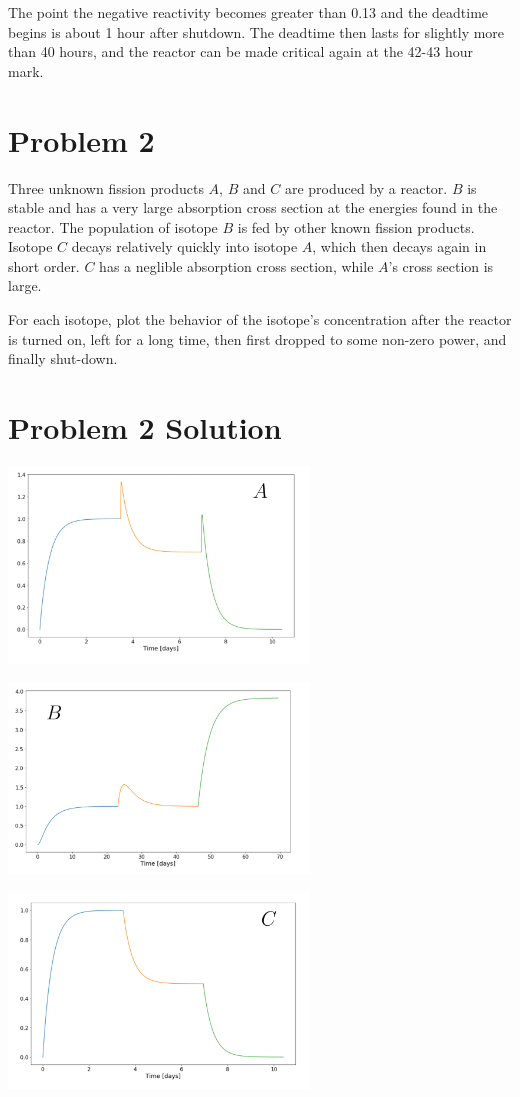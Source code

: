 \documentclass{report}
\begin{document}
\begin{enumerate}[a)]
The point the negative reactivity becomes greater than 0.13 and the deadtime begins is about 1 hour after shutdown. The deadtime then lasts for slightly more than 40 hours, and the reactor can be made critical again at the 42-43 hour mark.


\end{enumerate}



\newpage
\section*{Problem 2}

Three unknown fission products $A$, $B$ and $C$ are produced by a reactor. $B$ is stable and has a very large absorption cross section at the energies found in the reactor. The population of isotope $B$ is fed by other known fission products. Isotope $C$ decays relatively quickly into isotope $A$, which then decays again in short order. $C$ has a neglible absorption cross section, while $A$'s cross section is large. 

For each isotope, plot the behavior of the isotope's concentration after the reactor is turned on, left for a long time, then first dropped to some non-zero power, and finally shut-down.



\section*{Problem 2 Solution}

\includegraphics[width=8cm]{poison-A}

\includegraphics[width=8cm]{poison-B}

\includegraphics[width=8cm]{poison-C}

\end{document}
